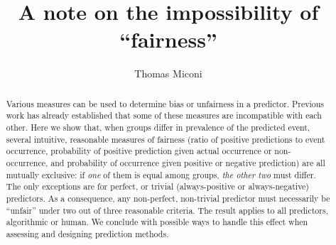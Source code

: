 \documentclass[twocolumn]{article}
\begin{document}





\title{A note on the impossibility of ``fairness''}

\author{Thomas Miconi}
\date{} 

\maketitle

\begin{abstract}

Various measures can be used to determine bias or unfairness in a
predictor. Previous work has already established that some of these measures
are incompatible with each other. Here we show that, when groups differ in prevalence
of the predicted event, several intuitive, reasonable measures of fairness (ratio of
positive predictions to event occurrence, probability of positive prediction
given actual occurrence or non-occurrence, and probability of occurrence given
positive or negative prediction) are all mutually exclusive: if \emph{one} of
them is equal among groups, \emph{the other two} must differ. The only
exceptions are for perfect, or trivial (always-positive or always-negative)
predictors. As a consequence, any non-perfect, non-trivial predictor must
necessarily be ``unfair'' under two out of three reasonable criteria. The result
applies to all predictors, algorithmic or human. We conclude with possible ways
to handle this effect when assessing and designing prediction methods.


\end{abstract}
\end{document}
